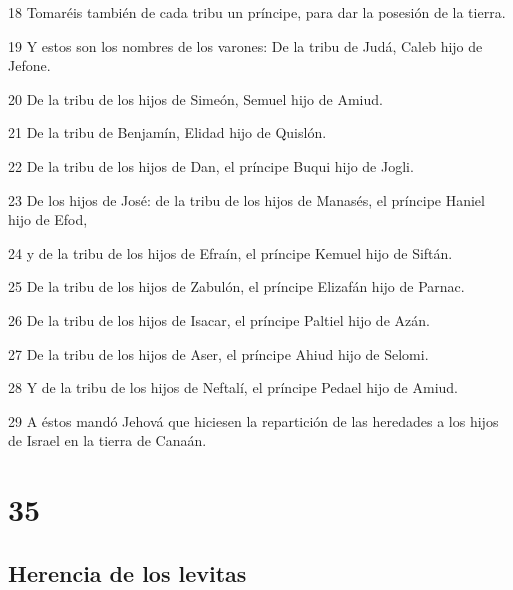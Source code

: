 \par 18 Tomaréis también de cada tribu un príncipe, para dar la posesión de la tierra.
\par 19 Y estos son los nombres de los varones: De la tribu de Judá, Caleb hijo de Jefone.
\par 20 De la tribu de los hijos de Simeón, Semuel hijo de Amiud.
\par 21 De la tribu de Benjamín, Elidad hijo de Quislón.
\par 22 De la tribu de los hijos de Dan, el príncipe Buqui hijo de Jogli.
\par 23 De los hijos de José: de la tribu de los hijos de Manasés, el príncipe Haniel hijo de Efod,
\par 24 y de la tribu de los hijos de Efraín, el príncipe Kemuel hijo de Siftán.
\par 25 De la tribu de los hijos de Zabulón, el príncipe Elizafán hijo de Parnac.
\par 26 De la tribu de los hijos de Isacar, el príncipe Paltiel hijo de Azán.
\par 27 De la tribu de los hijos de Aser, el príncipe Ahiud hijo de Selomi.
\par 28 Y de la tribu de los hijos de Neftalí, el príncipe Pedael hijo de Amiud. 
\par 29 A éstos mandó Jehová que hiciesen la repartición de las heredades a los hijos de Israel en la tierra de Canaán.

\chapter{35}

\section*{Herencia de los levitas}

